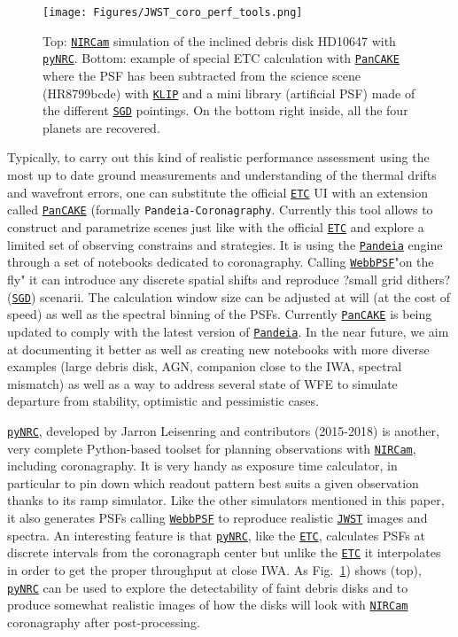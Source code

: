\documentclass[]{spie}  %
\newcommand{\jwst}{{\tt \href{https://jwst.stsci.edu}{JWST}}\xspace}
\newcommand{\nircam}{{\tt \href{https://jwst.stsci.edu/instrumentation/nircam}{NIRCam}}\xspace}
\newcommand{\etc}{{\tt \href{https://jwst.etc.stsci.edu/}{ETC}}\xspace}
\newcommand{\pynrc}{{\tt \href{https://pynrc.readthedocs.io/en/latest/}{pyNRC}}\xspace}
\newcommand{\pandeia}{{\tt \href{https://pypi.org/project/pandeia.engine/}{Pandeia}}\xspace}
\newcommand{\pancake}{{\tt \href{https://github.com/spacetelescope/pandeia-coronagraphy}{PanCAKE}}\xspace}
\newcommand{\sgd}{{\tt \href{https://jwst-docs.stsci.edu/display/JTI/NIRCam+Small+Grid+Dithers}{SGD}}\cite{jdox_general}\xspace}%
\newcommand{\klip}{{\tt \href{http://jwst-pipeline.readthedocs.io/en/latest/jwst/coron/main.html\#klip}{KLIP}}\xspace}%
\newcommand{\webbpsf}{{\tt \href{https://webbpsf.readthedocs.io/en/stable/}{WebbPSF}}\xspace}%
\begin{document}
\begin{figure}[h!]
\begin{center}
\texttt{[image: Figures/JWST\_coro\_perf\_tools.png]}
\caption{Top: \nircam simulation of the inclined debris disk HD10647 with \pynrc\cite{leisenring2018_pyNRC_prep}. Bottom: example of special ETC calculation with \pancake where the PSF has been subtracted from the science scene (HR8799bcde) with \klip and a mini library (artificial PSF) made of the different \sgd pointings. On the bottom right inside, all the four planets are recovered.}
\label{fig:jwst-perf}
\end{center}
\end{figure}

Typically, to carry out this kind of realistic performance assessment using the most up to date ground measurements and understanding of the thermal drifts and wavefront errors, one can substitute the official \etc UI with an extension called 
\pancake\cite{vangorkom2016_pandeia-coronagraphy} (formally {\tt Pandeia-Coronagraphy}. Currently this tool allows to construct and parametrize scenes just like with the official \etc and explore a limited set of observing constrains and strategies. It is using the \pandeia engine through a set of notebooks dedicated to coronagraphy. Calling \webbpsf "on the fly" it can introduce any discrete spatial shifts and reproduce ?small grid dithers? (\sgd) scenarii. The calculation window size can be adjusted at will (at the cost of speed) as well as the spectral binning of the PSFs. Currently \pancake is being updated to comply with the latest version of \pandeia. In the near future, we aim at documenting it better as well as creating new notebooks with more diverse examples (large debris disk, AGN, companion close to the IWA, spectral mismatch) as well as a way to address several state of WFE to simulate departure from stability, optimistic and pessimistic cases.

\pynrc, developed by Jarron Leisenring and contributors (2015-2018)\cite{leisenring2018_pyNRC_prep} is another, very complete Python-based toolset for planning observations with \nircam, including coronagraphy. It is very handy as exposure time calculator, in particular to pin down which readout pattern best suits a given observation thanks to its ramp simulator. Like the other simulators mentioned in this paper, it also generates PSFs calling \webbpsf to reproduce realistic \jwst images and spectra. 
An interesting feature is that \pynrc, like the \etc, calculates PSFs at discrete intervals from the coronagraph center but unlike the \etc it interpolates in order to get the proper throughput at close IWA.  As Fig.~\ref{fig:jwst-perf}) shows (top), \pynrc can be used to explore the detectability of faint debris disks and to produce somewhat realistic images of how the disks will look with \nircam coronagraphy after post-processing. 
\end{document}
